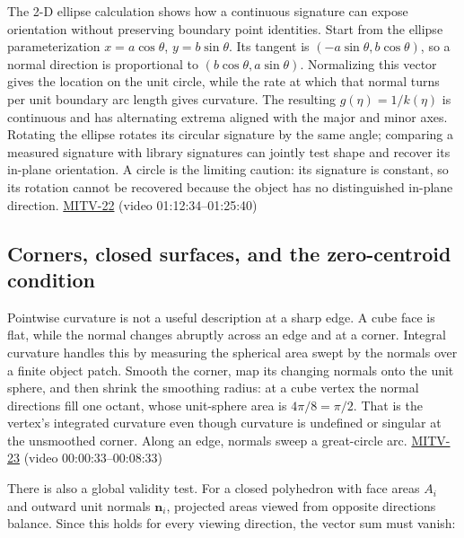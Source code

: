 The 2-D ellipse calculation shows how a continuous signature can expose orientation without preserving boundary point identities. Start from the ellipse parameterization \(x=a\cos\theta\), \(y=b\sin\theta\). Its tangent is \((-a\sin\theta,b\cos\theta)\), so a normal direction is proportional to \((b\cos\theta,a\sin\theta)\). Normalizing this vector gives the location on the unit circle, while the rate at which that normal turns per unit boundary arc length gives curvature. The resulting \(g(\eta)=1/k(\eta)\) is continuous and has alternating extrema aligned with the major and minor axes. Rotating the ellipse rotates its circular signature by the same angle; comparing a measured signature with library signatures can jointly test shape and recover its in-plane orientation. A circle is the limiting caution: its signature is constant, so its rotation cannot be recovered because the object has no distinguished in-plane direction. \hyperref[04-visual-computing-ii-ch036-mitv-22---exterior-orientation-recovering-position-orientation-bundle-adjustment-object-shape]{MITV-22} (video 01:12:34--01:25:40)

\subsection{Corners, closed surfaces, and the zero-centroid condition}\label{04-visual-computing-ii-ch032-corners-closed-surfaces-and-the-zero-centroid-condition}

Pointwise curvature is not a useful description at a sharp edge. A cube face is flat, while the normal changes abruptly across an edge and at a corner. Integral curvature handles this by measuring the spherical area swept by the normals over a finite object patch. Smooth the corner, map its changing normals onto the unit sphere, and then shrink the smoothing radius: at a cube vertex the normal directions fill one octant, whose unit-sphere area is \(4\pi/8=\pi/2\). That is the vertex's integrated curvature even though curvature is undefined or singular at the unsmoothed corner. Along an edge, normals sweep a great-circle arc. \hyperref[04-visual-computing-ii-ch036-mitv-23---gaussian-image-solids-of-revolution-direction-histograms-regular-polyhedra]{MITV-23} (video 00:00:33--00:08:33)

There is also a global validity test. For a closed polyhedron with face areas \(A_i\) and outward unit normals \(\mathbf n_i\), projected areas viewed from opposite directions balance. Since this holds for every viewing direction, the vector sum must vanish:

